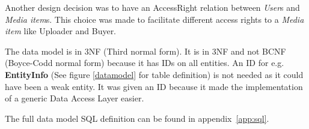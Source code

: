 \documentclass[../report.tex]{subfiles}
\begin{document}
Another design decision was to have an AccessRight relation between \textit{User}s and \textit{Media item}s. This choice was made to facilitate different access rights to a \textit{Media item} like Uploader and Buyer.

The data model is in 3NF (Third normal form). It is in 3NF and not BCNF (Boyce-Codd normal form) because it has IDs on all entities. An ID for e.g. \textbf{EntityInfo} (See figure \ref{datamodel} for table definition) is not needed as it could have been a weak entity. It was given an ID because it made the implementation of a generic Data Access Layer easier.

The full data model SQL definition can be found in appendix~\ref{app:sql}.
\end{document}
